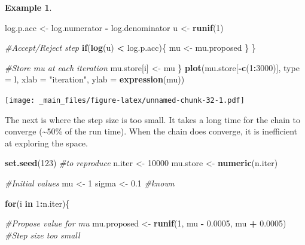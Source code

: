\documentclass[
]{book}
\newenvironment{Shaded}{\begin{snugshade}}{\end{snugshade}}
\newcommand{\AttributeTok}[1]{\textcolor[rgb]{0.13,0.29,0.53}{#1}}
\newcommand{\CommentTok}[1]{\textcolor[rgb]{0.56,0.35,0.01}{\textit{#1}}}
\newcommand{\ControlFlowTok}[1]{\textcolor[rgb]{0.13,0.29,0.53}{\textbf{#1}}}
\newcommand{\DecValTok}[1]{\textcolor[rgb]{0.00,0.00,0.81}{#1}}
\newcommand{\FloatTok}[1]{\textcolor[rgb]{0.00,0.00,0.81}{#1}}
\newcommand{\FunctionTok}[1]{\textcolor[rgb]{0.13,0.29,0.53}{\textbf{#1}}}
\newcommand{\NormalTok}[1]{#1}
\newcommand{\OtherTok}[1]{\textcolor[rgb]{0.56,0.35,0.01}{#1}}
\newcommand{\SpecialCharTok}[1]{\textcolor[rgb]{0.81,0.36,0.00}{\textbf{#1}}}
\newcommand{\StringTok}[1]{\textcolor[rgb]{0.31,0.60,0.02}{#1}}
\theoremstyle{definition}
\theoremstyle{definition}
\newtheorem{example}{Example}[chapter]
\theoremstyle{definition}
\theoremstyle{definition}
\theoremstyle{remark}
\begin{document}
\begin{example}
\begin{Shaded}
\begin{Highlighting}[]
\NormalTok{    log.p.acc }\OtherTok{\textless{}{-}}\NormalTok{ log.numerator }\SpecialCharTok{{-}}\NormalTok{ log.denominator}
\NormalTok{    u }\OtherTok{\textless{}{-}} \FunctionTok{runif}\NormalTok{(}\DecValTok{1}\NormalTok{)}
    
    \CommentTok{\#Accept/Reject step}
    \ControlFlowTok{if}\NormalTok{(}\FunctionTok{log}\NormalTok{(u) }\SpecialCharTok{\textless{}}\NormalTok{ log.p.acc)\{}
\NormalTok{      mu }\OtherTok{\textless{}{-}}\NormalTok{ mu.proposed}
\NormalTok{    \}}
\NormalTok{  \}}
  
  \CommentTok{\#Store mu at each iteration}
\NormalTok{  mu.store[i] }\OtherTok{\textless{}{-}}\NormalTok{ mu}
\NormalTok{\}}
\FunctionTok{plot}\NormalTok{(mu.store[}\SpecialCharTok{{-}}\FunctionTok{c}\NormalTok{(}\DecValTok{1}\SpecialCharTok{:}\DecValTok{3000}\NormalTok{)], }\AttributeTok{type =} \StringTok{\textquotesingle{}l\textquotesingle{}}\NormalTok{, }\AttributeTok{xlab =} \StringTok{"iteration"}\NormalTok{, }
     \AttributeTok{ylab =} \FunctionTok{expression}\NormalTok{(mu))}
\end{Highlighting}
\end{Shaded}

\texttt{[image: \_main\_files/figure-latex/unnamed-chunk-32-1.pdf]}

The next is where the step size is too small. It takes a long time for the chain to converge (\textasciitilde50\% of the run time). When the chain does converge, it is inefficient at exploring the space.

\begin{Shaded}
\begin{Highlighting}[]
\FunctionTok{set.seed}\NormalTok{(}\DecValTok{123}\NormalTok{) }\CommentTok{\#to reproduce}
\NormalTok{n.iter   }\OtherTok{\textless{}{-}} \DecValTok{10000}
\NormalTok{mu.store }\OtherTok{\textless{}{-}} \FunctionTok{numeric}\NormalTok{(n.iter)}

\CommentTok{\#Initial values}
\NormalTok{mu }\OtherTok{\textless{}{-}} \DecValTok{1} 
\NormalTok{sigma }\OtherTok{\textless{}{-}} \FloatTok{0.1} \CommentTok{\#known}

\ControlFlowTok{for}\NormalTok{(i }\ControlFlowTok{in} \DecValTok{1}\SpecialCharTok{:}\NormalTok{n.iter)\{}
  
  \CommentTok{\#Propose value for mu}
\NormalTok{  mu.proposed }\OtherTok{\textless{}{-}} \FunctionTok{runif}\NormalTok{(}\DecValTok{1}\NormalTok{, mu }\SpecialCharTok{{-}} \FloatTok{0.0005}\NormalTok{, mu }\SpecialCharTok{+} \FloatTok{0.0005}\NormalTok{) }\CommentTok{\#Step size too small}
  

\end{Highlighting}
\end{Shaded}
\end{example}
\end{document}
